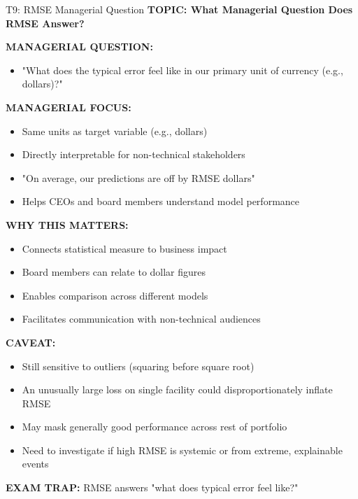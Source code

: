 \documentclass[8pt]{beamer}
\begin{document}
	\begin{frame}{T9: RMSE Managerial Question}
		\fontsize{6.5}{7.5}\selectfont
		\textbf{TOPIC: What Managerial Question Does RMSE Answer?}
		
		\vspace{0.1cm}
		\textbf{MANAGERIAL QUESTION:}
		\begin{itemize}
			\item "What does the typical error feel like in our primary unit of currency (e.g., dollars)?"
		\end{itemize}
		
		\vspace{0.1cm}
		\textbf{MANAGERIAL FOCUS:}
		\begin{itemize}
			\item Same units as target variable (e.g., dollars)
			\item Directly interpretable for non-technical stakeholders
			\item "On average, our predictions are off by RMSE dollars"
			\item Helps CEOs and board members understand model performance
		\end{itemize}
		
		\vspace{0.1cm}
		\textbf{WHY THIS MATTERS:}
		\begin{itemize}
			\item Connects statistical measure to business impact
			\item Board members can relate to dollar figures
			\item Enables comparison across different models
			\item Facilitates communication with non-technical audiences
		\end{itemize}
		
		\vspace{0.1cm}
		\textbf{CAVEAT:}
		\begin{itemize}
			\item Still sensitive to outliers (squaring before square root)
			\item An unusually large loss on single facility could disproportionately inflate RMSE
			\item May mask generally good performance across rest of portfolio
			\item Need to investigate if high RMSE is systemic or from extreme, explainable events
		\end{itemize}
		
		\textcolor{myred}{\textbf{EXAM TRAP:}} RMSE answers \textcolor{myblue}{"what does typical error feel like?"}
	\end{frame}
	
\end{document}
